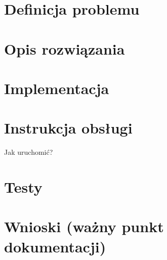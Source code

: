 \documentclass[11pt,a4paper]{article}
\begin{document}
\section{Definicja problemu}
\section{Opis rozwiązania}
\section{Implementacja}
\section{Instrukcja obsługi}
Jak uruchomić?
\section{Testy}
\section{Wnioski (ważny punkt dokumentacji)}

%
\end{document}
